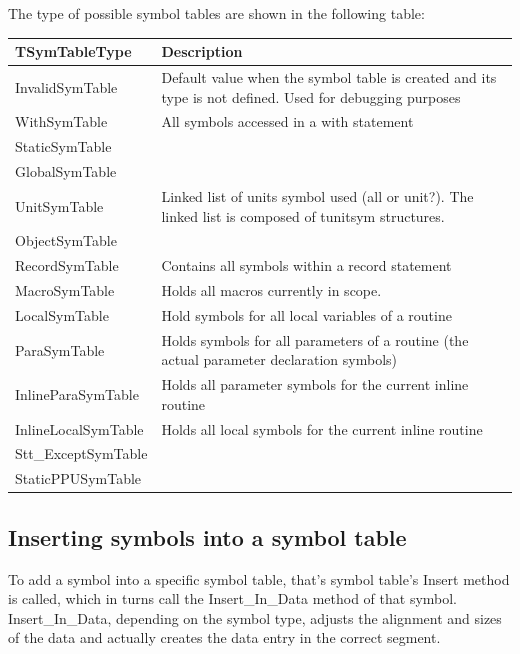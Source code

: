 \documentclass [a4paper,12pt]{article}
\begin{document}
The type of possible symbol tables are shown in the following table:

\begin{longtable}{|l|p{10cm}|}
\hline
TSymTableType& Description \\
\hline
\endhead
\hline
\endfoot
\textsf{InvalidSymTable}&
    Default value when the symbol table is created and its type is not defined. Used for debugging purposes \\
\textsf{WithSymTable}&
    All symbols accessed in a with statement \\
\textsf{StaticSymTable}&  \\
\textsf{GlobalSymTable}&  \\
\textsf{UnitSymTable}&
    Linked list of units symbol used (all or unit?). The linked list is
    composed of \textsf{tunitsym} structures. \\
\textsf{ObjectSymTable}&  \\
\textsf{RecordSymTable}&
    Contains all symbols within a record statement \\
\textsf{MacroSymTable}&
    Holds all macros currently in scope. \\
\textsf{LocalSymTable}&
    Hold symbols for all local variables of a routine \\
\textsf{ParaSymTable}&
    Holds symbols for all parameters of a routine (the actual parameter declaration symbols) \\
\textsf{InlineParaSymTable}&
    Holds all parameter symbols for the current inline routine \\
\textsf{InlineLocalSymTable}&
    Holds all local symbols for the current inline routine \\
\textsf{Stt{\_}ExceptSymTable}&  \\
\textsf{StaticPPUSymTable}& 
\label{tab36}
\end{longtable}

\subsection{Inserting symbols into a symbol table}
\label{subsec:inserting}

To add a symbol into a specific symbol table, that's symbol table's
\textsf{Insert} method is called, which in turns call the
\textsf{Insert{\_}In{\_}Data} method of that symbol.
\textsf{Insert{\_}In{\_}Data}, depending on the symbol type, adjusts the
alignment and sizes of the data and actually creates the data entry in the
correct segment.
\end{document}
